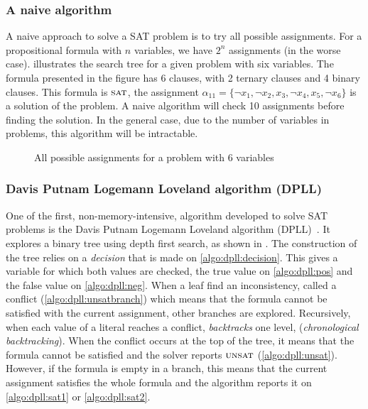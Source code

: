 \subsubsection{A naive algorithm}
A naive approach to solve a SAT problem is to try all possible assignments.
For a propositional formula with $n$ variables, we have $2^n$ assignments (in the worse case).  
 illustrates the search tree for a given problem with six variables.
The  formula presented in the figure has 6 clauses, with 2 ternary clauses and 4 binary clauses.
This formula is $\textsc{sat}$, the assignment
$\alpha_{11} = \{\neg x_1, \neg x_2, x_3, \neg x_4, x_5, \neg x_6 \}$ is a solution of the problem.
A naive algorithm will check 10 assignments before finding the solution. 
In the general case, due to the number of variables in problems, this algorithm will be intractable.
\begin{figure}[!htbp]
 \centering
 
 \caption{All possible assignments for a problem with 6 variables}
 \label{fig:naive_algo}
\end{figure}
\subsubsection{Davis Putnam Logemann Loveland algorithm (DPLL)}\label{sec:dpll}
One of the first, non-memory-intensive, algorithm developed to solve SAT problems is 
the Davis Putnam Logemann Loveland algorithm (DPLL)~\cite{dpll_62}. 
It explores a binary tree using depth first search, as shown in .
The construction of the tree  relies on a \emph{decision} that is made on \cref{algo:dpll:decision}.
This gives a variable for which both values are checked, the true value on \cref{algo:dpll:pos} and the false value on \cref{algo:dpll:neg}.
When a leaf find an inconsistency, called a conflict (\cref{algo:dpll:unsatbranch}) which means that the formula cannot be satisfied with
the current assignment, other branches are explored.
Recursively, when each value of a literal reaches a conflict,
\emph{backtracks} one level, (\emph{chronological backtracking}).
When the conflict occurs at the top of the tree, it means that the formula cannot be satisfied and the 
solver reports $\textsc{unsat}$ (\cref{algo:dpll:unsat}). However, if the formula is empty in a branch, 
this means that the current assignment satisfies the whole formula and the algorithm reports it on \cref{algo:dpll:sat1}
or \ref{algo:dpll:sat2}.

